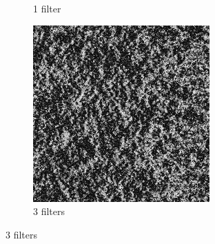 \documentclass[11pt, oneside]{article}   	%
\begin{document}
\begin{figure}[H]
\begin{subfigure}[b]{0.3\textwidth}
        \caption{1 filter}
        \label{fig:grass1}
    \end{subfigure}
    \begin{subfigure}[b]{0.3\textwidth}
        \includegraphics[width=\textwidth]{grass3}
        \caption{3 filters}
        \label{fig:grass3}
    \end{subfigure}
    

\end{figure}
\end{document}
